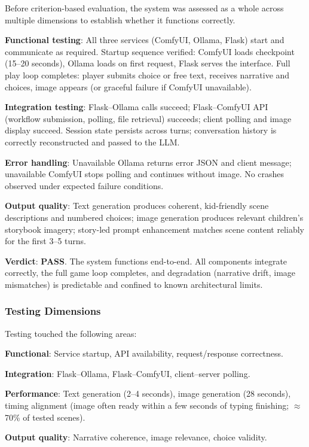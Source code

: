\documentclass[12pt,a4paper]{article}
\begin{document}
Before criterion-based evaluation, the system was assessed as a whole across multiple dimensions to establish whether it functions correctly.

\textbf{Functional testing}: All three services (ComfyUI, Ollama, Flask) start and communicate as required. Startup sequence verified: ComfyUI loads checkpoint (15--20 seconds), Ollama loads on first request, Flask serves the interface. Full play loop completes: player submits choice or free text, receives narrative and choices, image appears (or graceful failure if ComfyUI unavailable).

\textbf{Integration testing}: Flask--Ollama calls succeed; Flask--ComfyUI API (workflow submission, polling, file retrieval) succeeds; client polling and image display succeed. Session state persists across turns; conversation history is correctly reconstructed and passed to the LLM.

\textbf{Error handling}: Unavailable Ollama returns error JSON and client message; unavailable ComfyUI stops polling and continues without image. No crashes observed under expected failure conditions.

\textbf{Output quality}: Text generation produces coherent, kid-friendly scene descriptions and numbered choices; image generation produces relevant children's storybook imagery; story-led prompt enhancement matches scene content reliably for the first 3--5 turns.

\textbf{Verdict}: \textbf{PASS}. The system functions end-to-end. All components integrate correctly, the full game loop completes, and degradation (narrative drift, image mismatches) is predictable and confined to known architectural limits.

\subsubsection{Testing Dimensions}

Testing touched the following areas:

\textbf{Functional}: Service startup, API availability, request/response correctness.

\textbf{Integration}: Flask--Ollama, Flask--ComfyUI, client--server polling.

\textbf{Performance}: Text generation (2--4 seconds), image generation (28 seconds), timing alignment (image often ready within a few seconds of typing finishing; $\approx$70\% of tested scenes).

\textbf{Output quality}: Narrative coherence, image relevance, choice validity.
\end{document}
